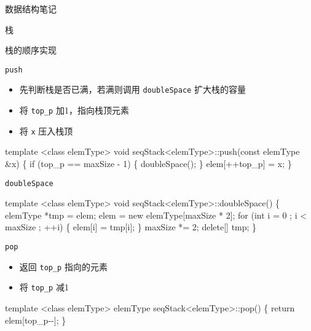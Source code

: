 \documentclass[
  ignorenonframetext,
]{beamer}
\newenvironment{Shaded}{}{}
\newcommand{\NormalTok}[1]{#1}
\providecommand{\tightlist}{%
  \setlength{\itemsep}{0pt}\setlength{\parskip}{0pt}}
\begin{document}
\begin{frame}[fragile]{数据结构笔记}
\begin{block}{栈}
\begin{block}{栈的顺序实现}
\begin{block}{\texttt{push}}
\protect{}\label{push}
\begin{itemize}
\tightlist
\item
  先判断栈是否已满，若满则调用 \texttt{doubleSpace} 扩大栈的容量
\item
  将 \texttt{top\_p} 加1，指向栈顶元素
\item
  将 \texttt{x} 压入栈顶
\end{itemize}

\begin{Shaded}
\begin{Highlighting}[]
\NormalTok{template \textless{}class elemType\textgreater{}}
\NormalTok{void seqStack\textless{}elemType\textgreater{}::push(const elemType \&x)}
\NormalTok{\{}
\NormalTok{  if (top\_p == maxSize {-} 1)}
\NormalTok{  \{}
\NormalTok{    doubleSpace();}
\NormalTok{  \}}
\NormalTok{  elem[++top\_p] = x;}
\NormalTok{\}}
\end{Highlighting}
\end{Shaded}

\begin{block}{\texttt{doubleSpace}}
\protect{}\label{doublespace}
\begin{Shaded}
\begin{Highlighting}[]
\NormalTok{template \textless{}class elemType\textgreater{}}
\NormalTok{void seqStack\textless{}elemType\textgreater{}::doubleSpace()}
\NormalTok{\{}
\NormalTok{  elemType *tmp = elem;}
\NormalTok{  elem = new elemType[maxSize * 2];}
\NormalTok{  for (int i = 0 ; i \textless{} maxSize ; ++i)}
\NormalTok{  \{}
\NormalTok{    elem[i] = tmp[i];}
\NormalTok{  \}}
\NormalTok{  maxSize *= 2;}
\NormalTok{  delete[] tmp;}
\NormalTok{\}}
\end{Highlighting}
\end{Shaded}
\end{block}

\begin{block}{\texttt{pop}}
\protect{}\label{pop}
\begin{itemize}
\tightlist
\item
  返回 \texttt{top\_p} 指向的元素
\item
  将 \texttt{top\_p} 减1
\end{itemize}

\begin{Shaded}
\begin{Highlighting}[]
\NormalTok{template \textless{}class elemType\textgreater{}}
\NormalTok{elemType seqStack\textless{}elemType\textgreater{}::pop()}
\NormalTok{\{}
\NormalTok{  return elem[top\_p{-}{-}];}
\NormalTok{\}}
\end{Highlighting}
\end{Shaded}
\end{block}


\end{block}
\end{block}
\end{block}
\end{frame}
\end{document}
